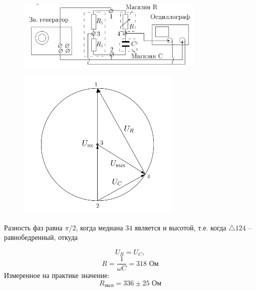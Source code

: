 \documentclass[a4paper, 12pt]{article}
\begin{document}
\begin {figure}[H]
\begin{center}
\includegraphics[width=0.8\textwidth]{phase.png}
\end{center}
\end {figure}


\begin {figure}[H]
\begin{center}
\includegraphics[width=0.7\textwidth]{diagramphase}
\end{center}
\end {figure}

Разность фаз равна $\pi /2$, когда медиана $34$ является и высотой, т.е. когда $\triangle 124$ -- равнобедренный, откуда

$$U_R=U_C,$$
$$R=\frac{1}{\omega C} = 318 \text{ Ом}$$
Измеренное на практике значение:
$$R_{\text{эксп}} = 336 \pm 25 \text{ Ом}$$ 
\end{document}
